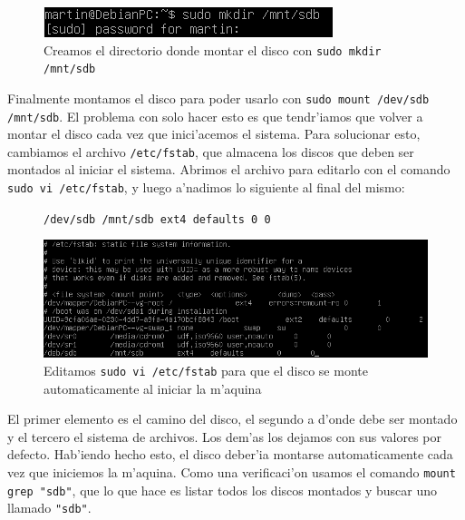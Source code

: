 \documentclass[11pt]{article}
\newcommand{\codetext}[2]{\large\texttt{\textcolor{#1}{#2}}}
\begin{document}
		\begin{figure}[H]
    			\centering \captionsetup{justification=centering}
    			\includegraphics[scale=0.75]{Images/rsync/rsync_disk_mount.PNG}
    			\caption{Creamos el directorio donde montar el disco con \texttt{sudo mkdir /mnt/sdb}}
    			\label{fig:rsync_disk_mount}
		\end{figure}

		Finalmente montamos el disco para poder usarlo con \texttt{sudo mount /dev/sdb /mnt/sdb}. El problema con solo hacer esto es que tendr'iamos que volver a montar el disco cada vez que inici'acemos el sistema. Para solucionar esto, cambiamos el archivo \texttt{/etc/fstab}, que almacena los discos que deben ser montados al iniciar el sistema. Abrimos el archivo para editarlo con el comando \texttt{sudo vi /etc/fstab}, y luego a'nadimos lo siguiente al final del mismo:

		\begin{figure}[H]
			\centering
			\begin{code-box}
				\codetext{dark-gray}{/dev/sdb /mnt/sdb ext4 defaults 0 0}
			\end{code-box}
		\end{figure}
		
		\begin{figure}[H]
    			\centering \captionsetup{justification=centering}
    			\includegraphics[scale=0.65]{Images/rsync/rsync_disk_automount.PNG}
    			\caption{Editamos \texttt{sudo vi /etc/fstab} para que el disco se monte automaticamente al iniciar la m'aquina}
    			\label{fig:rsync_disk_automount}
		\end{figure}

		El primer elemento es el camino del disco, el segundo a d'onde debe ser montado y el tercero el sistema de archivos. Los dem'as los dejamos con sus valores por defecto. Hab'iendo hecho esto, el disco deber'ia montarse automaticamente cada vez que iniciemos la m'aquina. Como una verificaci'on usamos el comando \texttt{mount \textbar\/ grep "sdb"}, que lo que hace es listar todos los discos montados y buscar uno llamado \texttt{"sdb"}.
\end{document}
